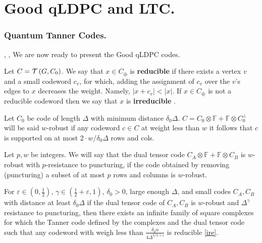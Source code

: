 \chapter{Good qLDPC and LTC.}

\subsection{Quantum Tanner Codes.}

 \cite{leverrier2022quantum}, \cite{Pavel}, \cite{Dinur}
We are now ready to present the Good qLDPC codes. 
  \begin{definition} Let $C = \mathcal{T}\left( G, C_0 \right)$. We say that $x \in C_{\oplus}$ is \textbf{reducible} if there exists a vertex $v$ and a small codeword $c_v$, for which, adding the assignment of $c_v$ over the $v$'s edges to $x$ decreases the weight. Namely, $|x + c_{v}| < |x|$. If $x \in C_{\oplus}$ is not a reducible codeword then we say that $x$ is \textbf{irreducible} \label{ire}. \end{definition}


\begin{definition}[$w$-Robustness] Let $C_{0}$ be code of length $\Delta$ with minimum distance $\delta_{0}\Delta$. $C = C_{0} \otimes \mathbb{F} + \mathbb{F}\otimes C_{0}^{\perp}$ will be said $w$-robust if any codeword $c \in C$ at weight less than $w$ it follows that $c$ is supported on at most $2\cdot w/\delta_{0}\Delta$ rows and cols.
\end{definition}

\begin{definition} Let $p,w$ be integers. We will say that the dual tensor code $C_{A} \otimes \mathbb{F} + \mathbb{F} \otimes C_{B}$ is $w$-robust with $p$-resistance to puncturing, if the code obtained by removing (puncturing) a subset of at most $p$ rows and columns is $w$-robust.   
\end{definition}

\begin{theorem}
  For $\varepsilon \in \left( 0,\frac{1}{2} \right)$, $\gamma\in \left( \frac{1}{2} + \varepsilon, 1 \right)$, $\delta_{0}> 0$, large enough $\Delta$, and small codes $C_{A},C_{B}$ with distance at least $\delta_{0}\Delta$ if the dual tensor code of $C_{A},C_{B}$ is $w$-robust and $\Delta^{\gamma}$ resistance to puncturing, then there exists an infinite family of square complexes for which the Tanner code defined by the complexes and the dual tensor code such that any codeword with weigh less than $ \frac{\delta_{0} n}{4\Delta^{3/2 + \varepsilon}} $ is reducible \cref{ire}.
\end{theorem}

